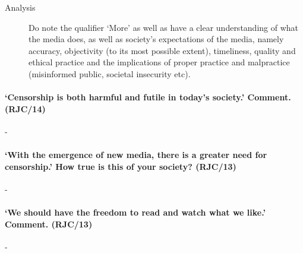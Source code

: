 \documentclass[../../main]{subfiles}
\begin{document}
\begin{description}
	\item[Analysis] Do note the qualifier `More' as well as have a clear understanding of what the media does, as well as society's expectations of the media, namely accuracy, objectivity (to its most possible extent), timeliness, quality and ethical practice and the implications of proper practice and malpractice (misinformed public, societal insecurity etc).
\end{description}


\paragraph{`Censorship is both harmful and futile in today's society.' Comment. (RJC/14)}-

\paragraph{`With the emergence of new media, there is a greater need for censorship.' How true is this of your society? (RJC/13)}-

\paragraph{`We should have the freedom to read and watch what we like.' Comment. (RJC/13)}-	
\end{document}
